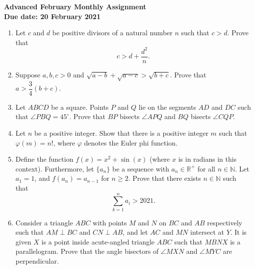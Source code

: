 \documentclass{article}
\begin{document}
\thispagestyle{empty}

\begin{center}
  \textbf{\Large Advanced February Monthly Assignment}
  \\ \vspace{1em}
  \textbf{\large Due date: 20 February 2021}
\end{center}

\vspace{12pt}

\begin{enumerate}[1.]

\vspace{24pt}
\item %
Let $c$ and $d$ be positive divisors of a natural number $n$ such that $c > d$. Prove that $$c > d + \frac{d^2}{n}.$$


\vspace{24pt}
\item %
Suppose $a,b,c > 0$ and $\sqrt{a-b} +\sqrt{a-c} > \sqrt{b+c}$. Prove that $a > \dfrac{3}{4} (b+c)$.


\vspace{24pt}
\item %
Let $ABCD$ be a square.
Points $P$ and $Q$ lie on the segments $AD$ and $DC$ such that $\angle PBQ = 45^\circ$.
Prove that $BP$ bisects $\angle APQ$ and $BQ$ bisects $\angle CQP$.


\vspace{24pt}
\item %
Let $n$ be a positive integer. Show that there is a positive integer $m$ such that $\varphi(m) = n!$, where $\varphi$ denotes the Euler phi function.


\vspace{24pt}
\item %
Define the function $f(x) = x^2 + \sin(x)$ (where $x$ is in radians in this context). Furthermore, let $\{a_n\}$ be a sequence with $a_n \in \mathbb{R}^+$ for all $n \in \mathbb{N}$. Let $a_1 = 1$, and $f(a_n) = a_{n - 1}$ for $n \ge 2$. Prove that there exists $n \in \mathbb{N}$ such that 
$$\sum_{k = 1}^n a_i > 2021.$$


\vspace{24pt}
\item %
Consider a triangle $ABC$ with points $M$ and $N$ on $BC$ and $AB$ respectively such that $AM \perp BC$ and $CN \perp AB$, and let $AC$ and $MN$ intersect at $Y$.
It is given $X$ is a point inside acute-angled triangle $ABC$ such that $MBNX$ is a parallelogram.
Prove that the angle bisectors of $\angle MXN$ and $\angle MYC$ are perpendicular.


\end{enumerate}
\end{document}

